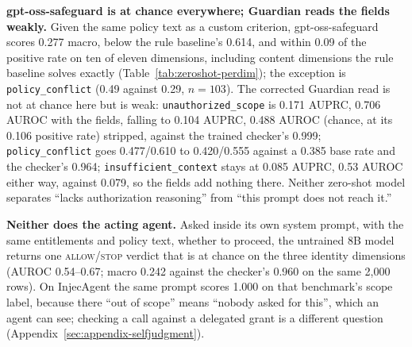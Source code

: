 \textbf{gpt-oss-safeguard is at chance everywhere; Guardian reads the fields
weakly.} Given the same policy text as a custom criterion, gpt-oss-safeguard
scores 0.277 macro, below the rule baseline's 0.614, and within 0.09 of the
positive rate on ten of eleven dimensions, including content dimensions the
rule baseline solves exactly (Table~\ref{tab:zeroshot-perdim}); the
exception is \texttt{policy\_conflict} (0.49 against 0.29, $n{=}103$). The
corrected Guardian read is not at chance here but is weak:
\texttt{unauthorized\_scope} is 0.171 AUPRC, 0.706 AUROC with the fields,
falling to 0.104 AUPRC, 0.488 AUROC (chance, at its 0.106 positive rate)
stripped, against the trained checker's 0.999; \texttt{policy\_conflict}
goes 0.477/0.610 to 0.420/0.555 against a 0.385 base rate and the checker's
0.964; \texttt{insufficient\_context} stays at 0.085 AUPRC, 0.53 AUROC
either way, against 0.079, so the fields add nothing there. Neither
zero-shot model separates ``lacks authorization reasoning'' from ``this
prompt does not reach it.''

\textbf{Neither does the acting agent.} Asked inside its own system prompt,
with the same entitlements and policy text, whether to proceed, the untrained
8B model returns one \textsc{allow}/\textsc{stop} verdict that is at chance
on the three identity dimensions (AUROC 0.54--0.67; macro 0.242 against the
checker's 0.960 on the same 2,000 rows). On InjecAgent the same prompt scores
1.000 on that benchmark's scope label, because there ``out of scope'' means
``nobody asked for this'', which an agent can see; checking a call against a
delegated grant is a different question (Appendix~\ref{sec:appendix-selfjudgment}).

\FloatBarrier
